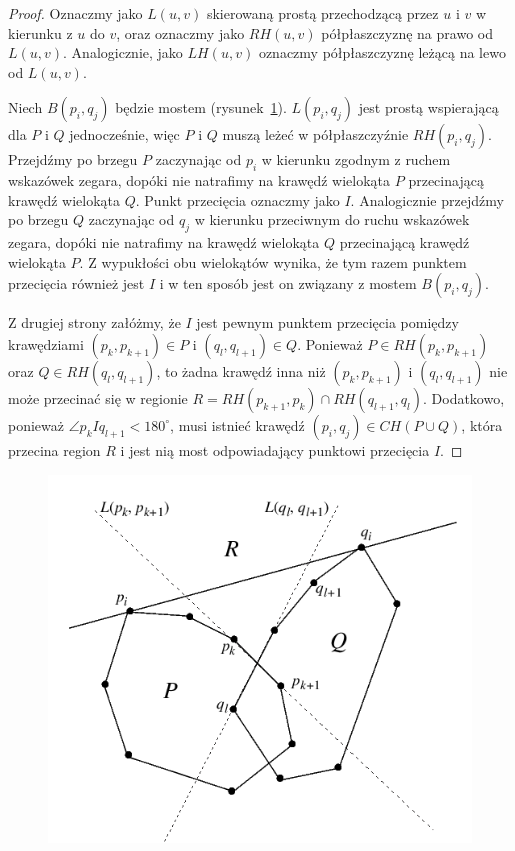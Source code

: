 \begin{proof}
  Oznaczmy jako $L(u, v)$ skierowaną prostą przechodzącą przez $u$ i
  $v$ w kierunku z $u$ do $v$, oraz oznaczmy jako $RH(u, v)$
  półpłaszczyznę na prawo od $L(u, v)$. Analogicznie, jako $LH(u, v)$
  oznaczmy półpłaszczyznę leżącą na lewo od $L(u, v)$.

  Niech $B(p_i, q_j)$ będzie mostem
  (rysunek~\ref{img:toussaint2}). $L(p_i, q_j)$ jest prostą
  wspierającą dla $P$ i $Q$ jednocześnie, więc $P$ i $Q$ muszą leżeć w
  półpłaszczyźnie $RH(p_i, q_j)$. Przejdźmy po brzegu $P$ zaczynając
  od $p_i$ w kierunku zgodnym z ruchem wskazówek zegara, dopóki nie
  natrafimy na krawędź wielokąta $P$ przecinającą krawędź wielokąta
  $Q$. Punkt przecięcia oznaczmy jako $I$. Analogicznie przejdźmy po
  brzegu $Q$ zaczynając od $q_j$ w kierunku przeciwnym do ruchu
  wskazówek zegara, dopóki nie natrafimy na krawędź wielokąta $Q$
  przecinającą krawędź wielokąta $P$. Z wypukłości obu wielokątów
  wynika, że tym razem punktem przecięcia również jest $I$ i w ten
  sposób jest on związany z mostem $B(p_i, q_j)$.

  Z drugiej strony załóżmy, że $I$ jest pewnym punktem przecięcia
  pomiędzy krawędziami $(p_k, p_{k+1}) \in P$ i $(q_l, q_{l+1}) \in
  Q$. Ponieważ $P \in RH(p_k, p_{k+1})$ oraz $Q \in RH(q_l, q_{l+1})$,
  to żadna krawędź inna niż $(p_k, p_{k+1})$ i $(q_l, q_{l+1})$ nie
  może przecinać się w regionie $R = RH(p_{k+1}, p_k) \cap RH(q_{l+1},
  q_l)$. Dodatkowo, ponieważ $\angle p_{k}Iq_{l+1} < 180^{\circ}$,
  musi istnieć krawędź $(p_i, q_j) \in CH(P \cup Q)$, która przecina
  region $R$ i jest nią most odpowiadający punktowi przecięcia $I$.
\end{proof}

\begin{figure}[htb]
  \centering
  \includegraphics[scale=0.7]{img/toussaint2}
  \caption{\label{img:toussaint2}}
\end{figure}


